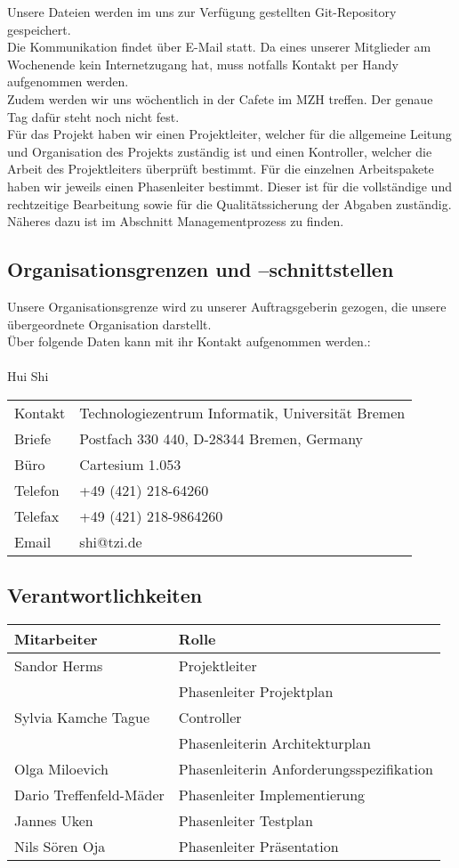 Unsere Dateien werden im uns zur Verfügung gestellten Git-Repository gespeichert.\\
Die Kommunikation findet über E-Mail statt. Da eines unserer Mitglieder am Wochenende kein Internetzugang hat, muss notfalls Kontakt per Handy aufgenommen werden. \\ 
Zudem werden wir uns wöchentlich in der Cafete im MZH treffen. Der genaue Tag dafür steht noch nicht fest.\\ 
Für das Projekt haben wir einen Projektleiter, welcher für die allgemeine Leitung und Organisation des Projekts zuständig ist und einen Kontroller, welcher die Arbeit des Projektleiters überprüft bestimmt. Für die einzelnen Arbeitspakete haben wir jeweils einen Phasenleiter bestimmt. Dieser ist für die vollständige und rechtzeitige Bearbeitung sowie für die Qualitätssicherung der Abgaben zuständig. Näheres dazu ist im Abschnitt Managementprozess zu finden.

\subsection{Organisationsgrenzen und --schnittstellen}

Unsere Organisationsgrenze wird zu unserer Auftragsgeberin gezogen, die unsere übergeordnete Organisation darstellt.\\
Über folgende Daten kann mit ihr Kontakt aufgenommen werden.: \\
\\
Hui Shi  \\
\begin{tabular}{l l}
Kontakt & Technologiezentrum Informatik, Universität Bremen \\
Briefe & Postfach 330 440, D-28344 Bremen, Germany \\
Büro & Cartesium 1.053 \\
Telefon & +49 (421) 218-64260 \\
Telefax & +49 (421) 218-9864260 \\
Email & shi@tzi.de \\
\end{tabular}

\subsection{Verantwortlichkeiten}
\begin{tabular}{|l|l|}
Mitarbeiter & Rolle \\
\hline
Sandor Herms & Projektleiter \\
 & Phasenleiter Projektplan \\
\hline
Sylvia Kamche Tague & Controller \\
& Phasenleiterin Architekturplan \\ 
\hline
Olga Miloevich & Phasenleiterin Anforderungsspezifikation \\
\hline
Dario Treffenfeld-Mäder & Phasenleiter Implementierung \\
\hline
Jannes Uken & Phasenleiter Testplan \\
\hline
Nils Sören Oja & Phasenleiter Präsentation
\end{tabular}